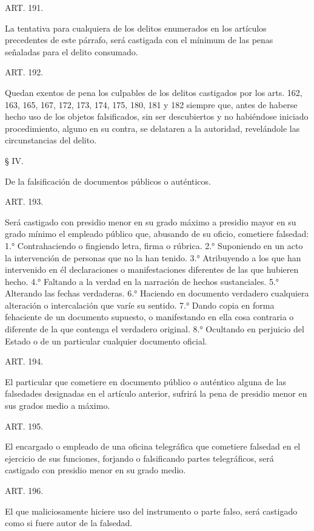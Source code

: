     ART. 191.

    La tentativa para cualquiera de los delitos enumerados en los artículos precedentes de este párrafo, será castigada con el mínimum de las penas señaladas para el delito consumado.


    ART. 192.

    Quedan exentos de pena los culpables de los delitos castigados por los arts. 162, 163, 165, 167, 172, 173, 174, 175, 180, 181 y 182 siempre que, antes de haberse hecho uso de los objetos falsificados, sin ser descubiertos y no habiéndose iniciado procedimiento, alguno en su contra, se delataren a la autoridad, revelándole las circunstancias del delito.


    § IV.

De la falsificación de documentos públicos o auténticos.



    ART. 193.

    Será castigado con presidio menor en su grado máximo a presidio mayor en su grado mínimo el empleado público que, abusando de su oficio, cometiere falsedad:
    1.° Contrahaciendo o fingiendo letra, firma o rúbrica.
    2.° Suponiendo en un acto la intervención de personas que no la han tenido.
    3.° Atribuyendo a los que han intervenido en él declaraciones o manifestaciones diferentes de las que hubieren hecho.
    4.° Faltando a la verdad en la narración de hechos sustanciales.
    5.° Alterando las fechas verdaderas.
    6.° Haciendo en documento verdadero cualquiera alteración o intercalación que varíe su sentido.
    7.° Dando copia en forma fehaciente de un documento supuesto, o manifestando en ella cosa contraria o diferente de la que contenga el verdadero original.
    8.° Ocultando en perjuicio del Estado o de un particular cualquier documento oficial.


    ART. 194.

    El particular que cometiere en documento público o auténtico alguna de las falsedades designadas en el artículo anterior, sufrirá la pena de presidio menor en sus grados medio a máximo.


    ART. 195.

    El encargado o empleado de una oficina telegráfica que cometiere falsedad en el ejercicio de sus funciones, forjando o falsificando partes telegráficos, será castigado con presidio menor en su grado medio.


    ART. 196.

    El que maliciosamente hiciere uso del instrumento o parte falso, será castigado como si fuere autor de la falsedad.



